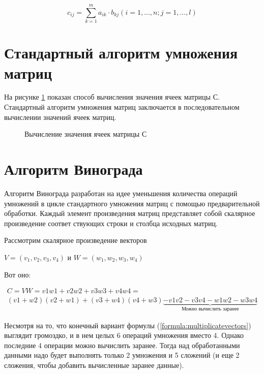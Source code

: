 \begin{equation}
  c_{ij} = \sum_{k=1}^{m} a_{ik} \cdot b_{kj} (i=1, ..., n; j = 1, ..., l)
\end{equation}\label{formula:elemcij}

\section{Стандартный алгоритм умножения матриц}\label{MatrixMultiplicate}

На рисунке \ref{ris:matrix} показан способ вычисления значения ячеек матрицы С. Стандартный алгоритм умножения матриц заключается в
последовательном вычислении значений ячеек матриц.

\begin{figure}[H]
  \caption{Вычисление значения ячеек матрицы С}
  \label{ris:matrix}
\end{figure}

\section{Алгоритм Винограда}\label{Vinograd}

Алгоритм Винограда разработан на идее уменьшения количества операций умножений в цикле стандартного умножения матриц 
с помощью предварительной обработки. Каждый элемент произведения матриц представляет собой скалярное произведение соответ
ствующих строки и столбца исходных матриц.

Рассмотрим скалярное произведение векторов 

$V = (v_1, v_2, v_3, v_4)$ и 
$W = (w_1, w_2, w_3, w_4)$

Вот оно:

{\centering
\begin{gather}
C = V W = v1  w1 + v2  w2 + v3  w3 + v4  w4 =\\
(v1+w2) (v2+w1) + (v3+w4)  (v4+w3) \underbrace{- v1  v2 - v3 v4 - w1 w2 - w3 w4}_{\text{Можно вычислить заранее}}
\end{gather}\label{formula:multiplicatevectors}}

Несмотря на то, что конечный вариант формулы (\ref{formula:multiplicatevectors}) выглядит громоздко, и в нем целых 
6 операций умножения вместо 4. Однако последние 4 операции можно вычислить заранее. Тогда над обработанными данными
надо будет выполнять только 2 умножения и 5 сложений (и еще 2 сложения, чтобы добавить вычисленные заранее данные).

